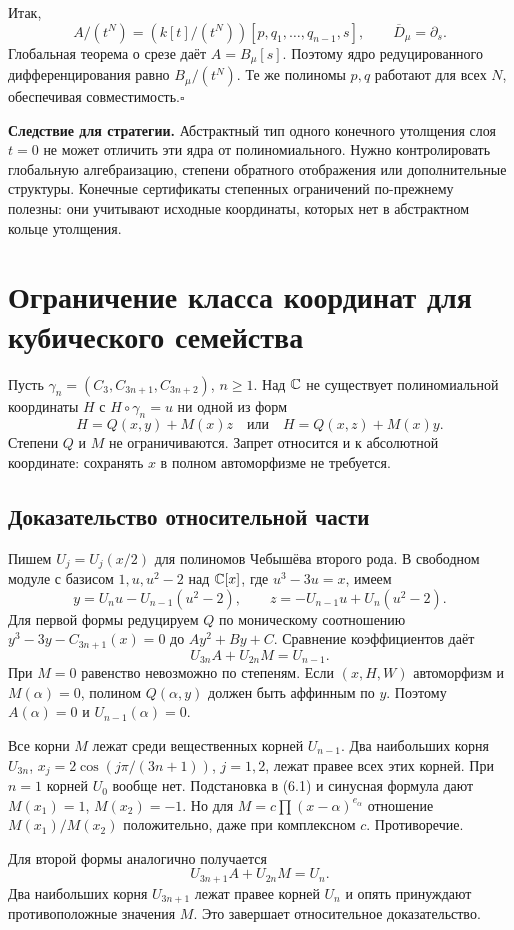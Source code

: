 Итак,
\[
A/(t^N)=(k[t]/(t^N))[p,q_1,\ldots,q_{n-1},s],\qquad\overline D_\mu=\partial_s.
\]
Глобальная теорема о срезе даёт $A=B_\mu[s]$. Поэтому ядро редуцированного дифференцирования равно $B_\mu/(t^N)$. Те же полиномы $p,q$ работают для всех $N$, обеспечивая совместимость.\hfill$\square$

\textbf{Следствие для стратегии.} Абстрактный тип одного конечного утолщения слоя $t=0$ не может отличить эти ядра от полиномиального. Нужно контролировать глобальную алгебраизацию, степени обратного отображения или дополнительные структуры. Конечные сертификаты степенных ограничений по-прежнему полезны: они учитывают исходные координаты, которых нет в абстрактном кольце утолщения.

\section{Ограничение класса координат для кубического семейства}\label{sec:uniform}
Пусть $\gamma_n=(C_3,C_{3n+1},C_{3n+2})$, $n\ge1$. Над ${\mathbb{C}}$ не существует полиномиальной координаты $H$ с $H\circ\gamma_n=u$ ни одной из форм
\[
\boxed{H=Q(x,y)+M(x)z\quad\text{или}\quad H=Q(x,z)+M(x)y.}
\]
Степени $Q$ и $M$ не ограничиваются. Запрет относится и к абсолютной координате: сохранять $x$ в полном автоморфизме не требуется.

\subsection*{Доказательство относительной части}
Пишем $U_j=U_j(x/2)$ для полиномов Чебышёва второго рода. В свободном модуле с базисом $1,u,u^2-2$ над ${\mathbb{C}}[x]$, где $u^3-3u=x$, имеем
\[
y=U_nu-U_{n-1}(u^2-2),\qquad
z=-U_{n-1}u+U_n(u^2-2).
\]
Для первой формы редуцируем $Q$ по моническому соотношению
$y^3-3y-C_{3n+1}(x)=0$ до $Ay^2+By+C$. Сравнение коэффициентов даёт
\[
U_{3n}A+U_{2n}M=U_{n-1}.\tag{6.1}
\]
При $M=0$ равенство невозможно по степеням. Если $(x,H,W)$ автоморфизм и $M(\alpha)=0$, полином $Q(\alpha,y)$ должен быть аффинным по $y$. Поэтому $A(\alpha)=0$ и $U_{n-1}(\alpha)=0$.

Все корни $M$ лежат среди вещественных корней $U_{n-1}$. Два наибольших корня $U_{3n}$,
$x_j=2\cos(j\pi/(3n+1))$, $j=1,2$, лежат правее всех этих корней. При $n=1$ корней $U_0$ вообще нет. Подстановка в (6.1) и синусная формула дают
$M(x_1)=1$, $M(x_2)=-1$.
Но для $M=c\prod(x-\alpha)^{e_\alpha}$ отношение $M(x_1)/M(x_2)$ положительно, даже при комплексном $c$. Противоречие.

Для второй формы аналогично получается
\[
U_{3n+1}A+U_{2n}M=U_n.
\]
Два наибольших корня $U_{3n+1}$ лежат правее корней $U_n$ и опять принуждают противоположные значения $M$. Это завершает относительное доказательство.

